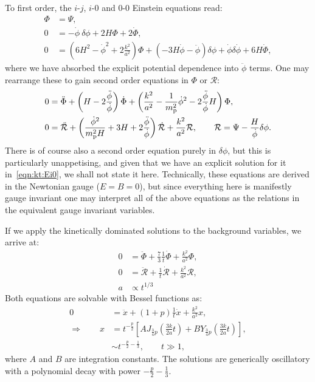 To first order, the \(i\)-\(j\), \(i\)-\(0\) and \(0\)-\(0\) Einstein equations read:
\begin{align}
  \Phi &= \Psi,
  \label{eqn:kt:Eij} \\
  0 &= -\dot{\phi}\:\delta\phi  + 2 H \Phi + 2 \dot{\Phi},
  \label{eqn:kt:Ei0}\\
  0 &= \left(6H^2-\dot{\phi}^2 + 2\frac{k^2}{a^2}\right)\Phi  + \left( -3H\dot{\phi} - \ddot{\phi} \right)\delta\phi + \dot{\phi}\delta\dot{\phi} +  6 H \dot{\Phi},
  \label{eqn:kt:E00}
\end{align}
where we have absorbed the explicit potential dependence into \(\ddot{\phi}\) terms. 
One may rearrange these to gain second order equations in \(\Phi\) or \(\mathcal{R}\):
\begin{align}
  0 &= \ddot{\Phi} + \left( H - 2 \frac{\ddot{\phi}}{\dot{\phi}} \right) \dot{\Phi} + \left( \frac{k^2}{a^2}-\frac{1}{m_{\mathrm{p}}^2}\dot{\phi}^2 - 2\frac{\ddot{\phi}}{\dot{\phi}}H \right)\Phi, \\
  0 &= \ddot{\mathcal{R}} + \left( \frac{\dot{\phi}^2}{m_{\mathrm{p}}^2H} + 3H + 2\frac{\ddot{\phi}}{\dot{\phi}} \right)\dot{\mathcal{R}} + \frac{k^2}{a^2}\mathcal{R}, \qquad \mathcal{R} = \Psi - \frac{H}{\dot{\phi}}\delta\phi.
\end{align}
There is of course also a second order equation purely in \(\delta\phi\), but this is particularly unappetising, and given that we have an explicit solution for it in~\eqref{eqn:kt:Ei0}, we shall not state it here.
Technically, these equations are derived in the Newtonian gauge (\(E=B=0\)), but since everything here is manifestly gauge invariant one may interpret all of the above equations as the relations in the equivalent gauge invariant variables.

If we apply the kinetically dominated solutions to the background variables, we arrive at:
\begin{align}
  0 &= \ddot{\Phi} + \frac{7}{3}\frac{1}{t}\dot{\Phi} + \frac{k^2}{a^2} \Phi,\\
  0 &= \ddot{\mathcal{R}} + \frac{1}{t}\dot{\mathcal{R}} + \frac{k^2}{a^2} \mathcal{R},\\
  a &\propto t^{1/3}
\end{align}
Both equations are solvable with Bessel functions as:
\begin{align}
  0 &=\ddot{x} + (1+p)\frac{1}{t}\dot{x} + \frac{k^2}{a^2} x,  \\
  \Rightarrow \qquad
  x &= t^{-\frac{p}{2}}\left[ A J_{\frac{3}{4}p}\left( \frac{3k}{2a} t \right) + B Y_{\frac{3}{4}p}\left( \frac{3k}{2a} t \right) \right], \\
  &\sim  t^{-\frac{p}{2}-\frac{1}{3}}, \qquad t \gg 1,
\end{align}
where \(A\) and \(B\) are integration constants. The solutions are generically oscillatory with a polynomial decay with power \(-\frac{p}{2} - \frac{1}{3}\).

